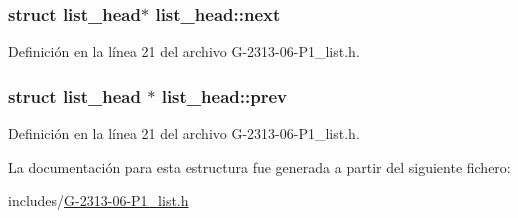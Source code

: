 \subsubsection[{next}]{\setlength{\rightskip}{0pt plus 5cm}struct {\bf list\+\_\+head}$\ast$ list\+\_\+head\+::next}\label{structlist__head_ac3b0ff0dfb978a0cfbdad6b9d19cdcfe}


Definición en la línea 21 del archivo G-\/2313-\/06-\/\+P1\+\_\+list.\+h.

\hypertarget{structlist__head_aaa0eabda8877e1d6de73a33f223ad004}{}
\subsubsection[{prev}]{\setlength{\rightskip}{0pt plus 5cm}struct {\bf list\+\_\+head} $\ast$ list\+\_\+head\+::prev}\label{structlist__head_aaa0eabda8877e1d6de73a33f223ad004}


Definición en la línea 21 del archivo G-\/2313-\/06-\/\+P1\+\_\+list.\+h.



La documentación para esta estructura fue generada a partir del siguiente fichero\+:\begin{DoxyCompactItemize}
\item 
includes/\hyperlink{G-2313-06-P1__list_8h}{G-\/2313-\/06-\/\+P1\+\_\+list.\+h}\end{DoxyCompactItemize}
